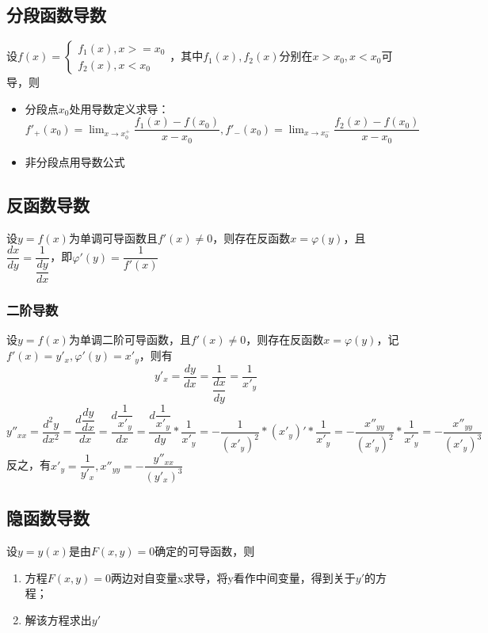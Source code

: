 \subsection{分段函数导数}

设\(f(x) = 
\begin{cases}
f_1(x), x >= x_0 \\ 
f_2(x), x < x_0
\end{cases}\)，其中\(f_1(x), f_2(x)\)分别在\(x > x_0, x < x_0\)可导，则\begin{itemize}
    \item 分段点\(x_0\)处用导数定义求导：\(f'_+(x_0) = \displaystyle \lim_{x \to x^+_0}\dfrac{f_1(x) - f(x_0)}{x - x_0}, f'_-(x_0) = \displaystyle \lim_{x \to x^-_0}\dfrac{f_2(x) - f(x_0)}{x - x_0}\)
    \item 非分段点用导数公式
\end{itemize}


\subsection{反函数导数}

设\(y = f(x)\)为单调可导函数且\(f'(x) \neq 0\)，则存在反函数\(x = \varphi(y)\)，且\(\dfrac{dx}{dy} = \dfrac{1}{\dfrac{dy}{dx}}\)，即\(\varphi'(y) = \dfrac{1}{f'(x)}\)

\subsubsection{二阶导数}
设\(y = f(x)\)为单调二阶可导函数，且\(f'(x) \neq 0\)，则存在反函数\(x = \varphi(y)\)，记\(f'(x) = y'_x, \varphi'(y) = x'_y\)，则有\[y'_x = \dfrac{dy}{dx} = \dfrac{1}{\dfrac{dx}{dy}} = \dfrac{1}{x'_y}\]
\[y''_{xx} = \dfrac{d^2y}{dx^2} = \dfrac{d\dfrac{dy}{dx}}{dx} = \dfrac{d\dfrac{1}{x'_y}}{dx} = \dfrac{d\dfrac{1}{x'_y}}{dy} * \dfrac{1}{x'_y} = -\dfrac{1}{(x'_y)^2} * (x'_y)' * \dfrac{1}{x'_y} = -\dfrac{x''_{yy}}{(x'_y)^2} * \dfrac{1}{x'_y} = -\dfrac{x''_{yy}}{(x'_y)^3}\]
反之，有\(x'_y = \dfrac{1}{y'_x}, x''_{yy} = -\dfrac{y''_{xx}}{(y'_x)^3}\)


\subsection{隐函数导数}

设\(y = y(x)\)是由\(F(x, y) = 0\)确定的可导函数，则\begin{enumerate}
    \item 方程\(F(x, y) = 0\)两边对自变量x求导，将y看作中间变量，得到关于\(y'\)的方程；
    \item 解该方程求出\(y'\)
\end{enumerate}


